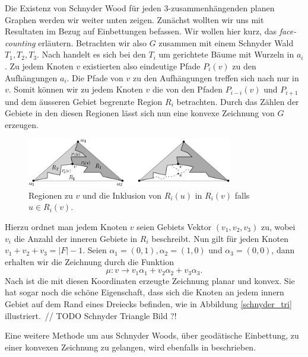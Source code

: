 {Die Existenz von Schnyder Wood für jeden 3-zusammenhängenden planen Graphen werden wir weiter unten zeigen. Zunächst wollten wir uns mit Resultaten im Bezug auf Einbettungen befassen.
Wir wollen hier kurz, das \textit{face-counting}\cite{felsner01} erläutern. Betrachten wir also $G$ zusammen mit einem Schnyder Wald $T_1,T_2,T_3$. Nach \cite[Korollar 2.5]{felsner04} handelt es sich bei den $T_i$ um gerichtete Bäume mit Wurzeln in $a_i$. Zu jedem Knoten $v$ existierten also eindeutige Pfade $P_i(v)$ zu den Aufhängungen $a_i$. Die Pfade von $v$ zu den Aufhängungen treffen sich nach \cite[Lemma 2.4]{felsner04} nur in $v$. Somit können wir zu jedem Knoten $v$ die von den Pfaden $P_{i-i}(v)$ und $P_{i+1}$ und dem äusseren Gebiet begrenzte Region $R_i$ betrachten. Durch das Zählen der Gebiete in den diesen Regionen lässt sich nun eine konvexe Zeichnung von $G$ erzeugen.

\begin{figure}[h]
	\centering
  \includegraphics[width=0.8\textwidth]{schnyder_reg.png}
	\caption{Regionen zu $v$ und die Inklusion von $R_i(u)$ in $R_i(v)$ falls $u \in R_i(v)$.}
\end{figure}

Hierzu ordnet man jedem Knoten $v$ seien Gebiets Vektor $(v_1,v_2,v_3)$ zu, wobei $v_i$ die Anzahl der inneren Gebiete in $R_i$ beschreibt. Nun gilt für jeden Knoten $v_1+v_2+v_3 = |F|-1$. Seien $\alpha_1 = (0,1),\alpha_2 = (1,0)$ und $\alpha_3 = (0,0)$, dann erhalten wir die Zeichnung durch die Funktion 
$$\mu:v\to v_1\alpha_1 + v_2\alpha_2+v_3\alpha_3.$$ 
Nach \cite[Theorem 2.7]{felsner04} ist die mit diesen Koordinaten erzeugte Zeichnung planar und konvex. Sie hat sogar noch die schöne Eigenschaft, dass sich die Knoten an jedem innern Gebiet auf dem Rand eines Dreiecks befinden, wie in Abbildung \ref{schnyder_tri} illustriert.\
// TODO Schnyder Triangle Bild ?!

Eine weitere Methode um aus Schnyder Woods, über geodätische Einbettung, zu einer konvexen Zeichnung zu gelangen, wird ebenfalls in \cite{felsner04} beschrieben.

}
